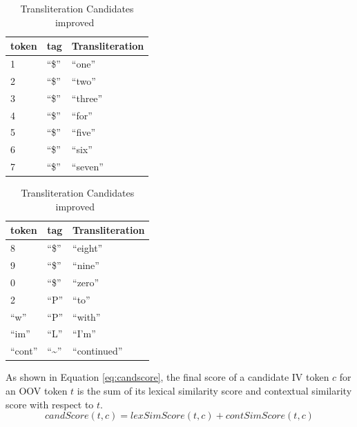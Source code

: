\documentclass[a4paper,onesided,12pt]{report}
\begin{document}
\begin{table}[ht]
  \begin{minipage}[c]{0.5\linewidth}
    \begin{tabular}[l]{lll}
    \hline
    token & tag & Transliteration \\
    \hline
    1 & ``\$'' & ``one'' \\
    2 & ``\$'' & ``two'' \\
    3 & ``\$'' & ``three'' \\
    4 & ``\$'' & ``for'' \\
    5 & ``\$'' & ``five'' \\
    6 & ``\$'' & ``six'' \\
    7 & ``\$'' & ``seven'' \\
    \hline
  \end{tabular}
\end{minipage}
  \begin{minipage}[c]{0.5\linewidth}
    \begin{tabular}[l]{lll}
    \hline
    token & tag & Transliteration \\
    \hline
    8 & ``\$'' & ``eight'' \\
    9 & ``\$'' & ``nine'' \\
    0 & ``\$'' & ``zero'' \\
    2 & ``P''  & ``to'' \\
    ``w'' & ``P''  & ``with'' \\
    ``im'' & ``L''  & ``I'm'' \\
    ``cont'' & ``\textasciitilde''  & ``continued'' \\
    \hline
  \end{tabular}
  \end{minipage}
  \caption{Transliteration Candidates improved~\cite{Gouws:2011:CBL:2021109.2021113}}
\label{tab:transliteral}
\end{table}


As shown in Equation \ref{eq:candscore}, the final score of a candidate IV token $c$ for an OOV token $t$ is the sum of its lexical similarity score and contextual similarity score with respect to $t$.
\begin{equation}
candScore(t,c) = lexSimScore(t,c) + contSimScore(t,c)
\label{eq:candscore}
\end{equation}
\end{document}

